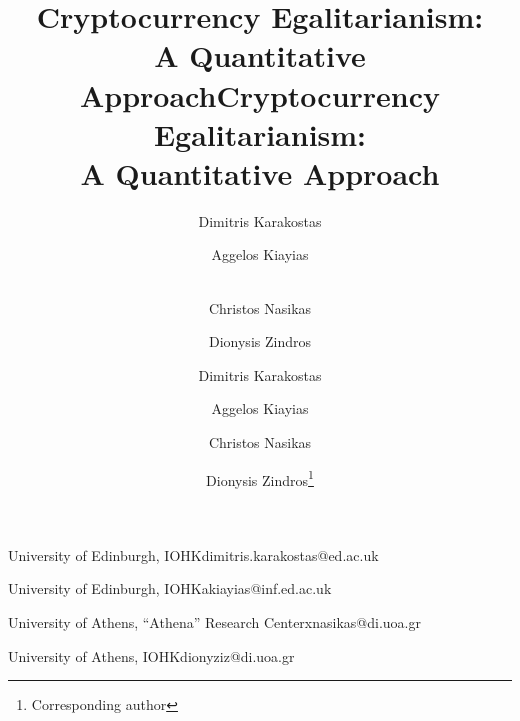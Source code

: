 
\iflncs
\title{Cryptocurrency Egalitarianism:\\A Quantitative Approach}
\else
\title{Cryptocurrency Egalitarianism:\protect\\A Quantitative Approach} %

\fi

\ifanonymous
   \author{}
   \iflncs
     \institute{}
   \fi
\else
  \iflncs
     \author{
             Dimitris Karakostas  \and
             Aggelos Kiayias  \and\\
             Christos Nasikas  \and
             Dionysis Zindros 
     }
 \else
    \author{Dimitris Karakostas}{University of Edinburgh, IOHK}{dimitris.karakostas@ed.ac.uk}{}{}%

    \author{Aggelos Kiayias}{University of Edinburgh, IOHK}{akiayias@inf.ed.ac.uk}{}{}
    \author{Christos Nasikas}{University of Athens, ``Athena'' Research Center}{xnasikas@di.uoa.gr}{}{}
    \author{Dionysis Zindros\footnote{Corresponding author}}{University of Athens, IOHK}{dionyziz@di.uoa.gr}{}{}

  \fi
\fi
\iflncs
  \maketitle
\fi
